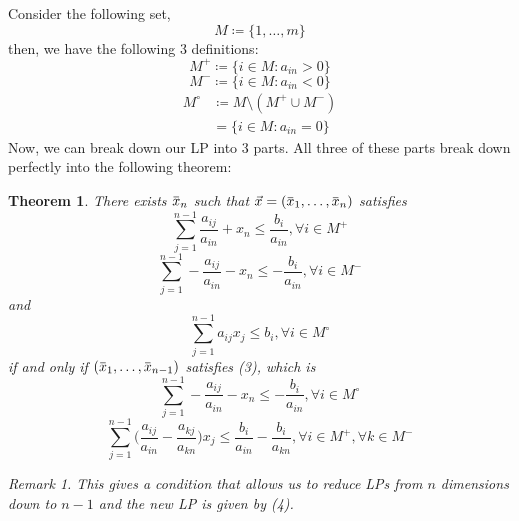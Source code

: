 \documentclass[11pt]{article}
\newtheorem{theorem}{Theorem}[subsection]
\theoremstyle{definition}
\theoremstyle{definition}
\theoremstyle{definition}
\theoremstyle{remark}
\newtheorem*{remark}{Remark}
\renewcommand{\bar}[1]{\mkern 1.5mu\overline{\mkern-1.5mu#1\mkern-1.5mu}\mkern 1.5mu}
\begin{document}
Consider the following set,
\begin{equation*}
M \coloneqq \{1 ,\dots, m\} 
\end{equation*}
then, we have the following 3 definitions:
\begin{equation*}
M^+ \coloneqq \{i \in M : a_{in} > 0\}
\end{equation*}
\begin{equation*}
M^- \coloneqq \{i \in M : a_{in} < 0\}
\end{equation*}
\begin{align*}
M^\circ &\coloneqq M \setminus (M^+ \cup M^-)\\
&= \{i \in M: a_{in} = 0\}
\end{align*}
Now, we can break down our LP into 3 parts. All three of these parts break down
perfectly into the following theorem:
\begin{theorem}
There exists $\bar{x}_n$ such that $\vec x = (\bar{x}_1, \dots, \bar{x}_n)$
satisfies
\begin{equation}
\sum^{n-1}_{j=1} \frac{a_{ij}}{a_{in}} + x_n \leq \frac{b_i}{a_{in}}, \forall i
\in M^+
\end{equation}
\begin{equation}
\sum^{n-1}_{j=1} -\frac{a_{ij}}{a_{in}} - x_n \leq -\frac{b_i}{a_{in}}, \forall i
\in M^-
\end{equation}
and
\begin{equation}
\sum^{n-1}_{j=1}a_{ij}x_j \leq  b_i, \forall i \in M^\circ
\end{equation}
if and only if $(\bar{x}_1, \dots, \bar{x}_{n-1})$ satisfies (3), which is
\begin{equation*}
\sum^{n-1}_{j=1} -\frac{a_{ij}}{a_{in}} - x_n \leq -\frac{b_i}{a_{in}}, \forall i
\in M^\circ
\end{equation*}
\begin{equation}
\sum^{n-1}_{j=1}\Big(\frac{a_{ij}}{a_{in}} - \frac{a_{kj}}{a_{kn}} \Big)x_j
\leq \frac{b_i}{a_{in}} - \frac{b_i}{a_{kn}} , \forall i \in M^+, \forall k \in
M^-
\end{equation}
\begin{remark}
This gives a condition that allows us to reduce LPs from $n$ dimensions down to
$n-1$ and the new LP is given by (4).
\end{remark}
\end{theorem}
\end{document}
